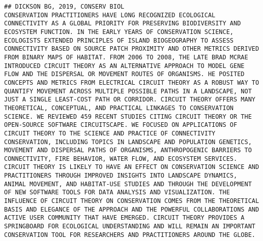 \documentclass[]{article}
\begin{document}
\begin{verbatim}
## DICKSON BG, 2019, CONSERV BIOL                                                                                                                                                                                                                                                                                                                                                                                                                       CONSERVATION PRACTITIONERS HAVE LONG RECOGNIZED ECOLOGICAL CONNECTIVITY AS A GLOBAL PRIORITY FOR PRESERVING BIODIVERSITY AND ECOSYSTEM FUNCTION. IN THE EARLY YEARS OF CONSERVATION SCIENCE, ECOLOGISTS EXTENDED PRINCIPLES OF ISLAND BIOGEOGRAPHY TO ASSESS CONNECTIVITY BASED ON SOURCE PATCH PROXIMITY AND OTHER METRICS DERIVED FROM BINARY MAPS OF HABITAT. FROM 2006 TO 2008, THE LATE BRAD MCRAE INTRODUCED CIRCUIT THEORY AS AN ALTERNATIVE APPROACH TO MODEL GENE FLOW AND THE DISPERSAL OR MOVEMENT ROUTES OF ORGANISMS. HE POSITED CONCEPTS AND METRICS FROM ELECTRICAL CIRCUIT THEORY AS A ROBUST WAY TO QUANTIFY MOVEMENT ACROSS MULTIPLE POSSIBLE PATHS IN A LANDSCAPE, NOT JUST A SINGLE LEAST-COST PATH OR CORRIDOR. CIRCUIT THEORY OFFERS MANY THEORETICAL, CONCEPTUAL, AND PRACTICAL LINKAGES TO CONSERVATION SCIENCE. WE REVIEWED 459 RECENT STUDIES CITING CIRCUIT THEORY OR THE OPEN-SOURCE SOFTWARE CIRCUITSCAPE. WE FOCUSED ON APPLICATIONS OF CIRCUIT THEORY TO THE SCIENCE AND PRACTICE OF CONNECTIVITY CONSERVATION, INCLUDING TOPICS IN LANDSCAPE AND POPULATION GENETICS, MOVEMENT AND DISPERSAL PATHS OF ORGANISMS, ANTHROPOGENIC BARRIERS TO CONNECTIVITY, FIRE BEHAVIOR, WATER FLOW, AND ECOSYSTEM SERVICES. CIRCUIT THEORY IS LIKELY TO HAVE AN EFFECT ON CONSERVATION SCIENCE AND PRACTITIONERS THROUGH IMPROVED INSIGHTS INTO LANDSCAPE DYNAMICS, ANIMAL MOVEMENT, AND HABITAT-USE STUDIES AND THROUGH THE DEVELOPMENT OF NEW SOFTWARE TOOLS FOR DATA ANALYSIS AND VISUALIZATION. THE INFLUENCE OF CIRCUIT THEORY ON CONSERVATION COMES FROM THE THEORETICAL BASIS AND ELEGANCE OF THE APPROACH AND THE POWERFUL COLLABORATIONS AND ACTIVE USER COMMUNITY THAT HAVE EMERGED. CIRCUIT THEORY PROVIDES A SPRINGBOARD FOR ECOLOGICAL UNDERSTANDING AND WILL REMAIN AN IMPORTANT CONSERVATION TOOL FOR RESEARCHERS AND PRACTITIONERS AROUND THE GLOBE.

\end{verbatim}
\end{document}
